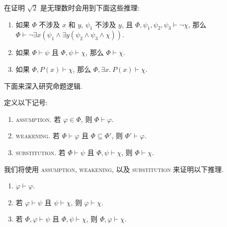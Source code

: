 \begin{example}
    在证明 $\sqrt{2}$ 是无理数时会用到下面这些推理:
    \begin{enumerate}[itemindent=0ex, itemsep=0pt, label=\upshape{(\alph*)}]
        \item 如果 $\Phi$ 不涉及 $x$ 和 $y$, $\psi_1$ 不涉及 $y$, 且 $\Phi, \psi_1, \psi_2, \psi_3\vdash\neg\chi$, 那么 $\Phi\vdash \neg\exists x(\psi_1\wedge\exists y(\psi_2\wedge\psi_3\wedge\chi))$.
        \item 如果 $\Phi\vdash\psi$ 且 $\Phi,\psi\vdash\chi$, 那么 $\Phi\vdash\chi$.
        \item 如果 $\Phi,P(x)\vdash\chi$, 那么 $\Phi,\exists x.\ P(x)\vdash\chi$.
    \end{enumerate}
\end{example}

下面来深入研究命题逻辑.

\begin{definition}
    定义以下记号: 
    \begin{enumerate}[itemindent=0ex, itemsep=0pt, label=\upshape{(\alph*)}]
        \item \textsc{assumption}. 若 $\varphi\in\Phi$, 则 $\Phi\vdash\varphi$. 
        \item \textsc{weakening}. 若 $\Phi\vdash\varphi$ 且 $\Phi\subseteq\Phi'$, 则 $\Phi'\vdash\varphi$.
        \item \textsc{substitution}. 若 $\Phi\vdash\psi$ 且 $\Phi,\psi\vdash\chi$, 则 $\Phi\vdash\chi$.
    \end{enumerate}
\end{definition}

\begin{example}
    我们将使用 \textsc{assumption}, \textsc{weakening}, 以及 \textsc{substitution} 来证明以下推理.
    \begin{enumerate}[itemindent=0ex, itemsep=0pt, label=\upshape{(\alph*)}]
        \item $\varphi\vdash\varphi$.
        \item 若 $\varphi\vdash\psi$ 且 $\psi\vdash\chi$, 则 $\varphi\vdash\chi$.
        \item 若 $\Phi, \varphi\vdash\psi$ 且 $\Phi, \psi\vdash\chi$, 则 $\Phi, \varphi\vdash\chi$.
    \end{enumerate}
\end{example}

